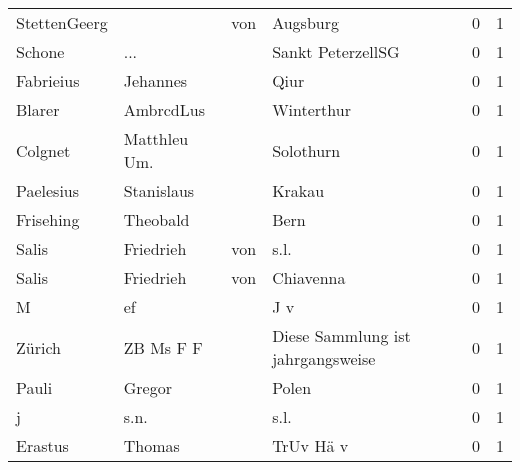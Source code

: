 \begin{center}
\begin{tiny}
\begin{longtabu}{llllrr}
             StettenGeerg &                                    &         von &                                    Augsburg &          0 &         1 \\
                   Schone &                                ... &             &                           Sankt PeterzellSG &          0 &         1 \\
                Fabrieius &                           Jehannes &             &                                        Qiur &          0 &         1 \\
                   Blarer &                          AmbrcdLus &             &                                  Winterthur &          0 &         1 \\
                  Colgnet &                       Matthleu Um. &             &                                   Solothurn &          0 &         1 \\
                Paelesius &                         Stanislaus &             &                                      Krakau &          0 &         1 \\
                Frisehing &                           Theobald &             &                                        Bern &          0 &         1 \\
                    Salis &                          Friedrieh &         von &                                        s.l. &          0 &         1 \\
                    Salis &                          Friedrieh &         von &                                   Chiavenna &          0 &         1 \\
                        M &                                 ef &             &                                         J v &          0 &         1 \\
                   Zürich &                          ZB Ms F F &             &           Diese Sammlung ist jahrgangsweise &          0 &         1 \\
                    Pauli &                             Gregor &             &                                       Polen &          0 &         1 \\
                        j &                               s.n. &             &                                        s.l. &          0 &         1 \\
                  Erastus &                             Thomas &             &                                   TrUv Hä v &          0 &         1 \\

\end{longtabu}
\end{tiny}
\end{center}
